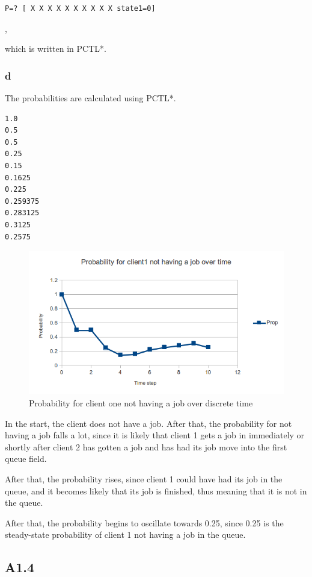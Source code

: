 \begin{verbatim}P=? [ X X X X X X X X X X state1=0]\end{verbatim},

which is written in PCTL*.

\subsubsection{d}

The probabilities are calculated using PCTL*.

\begin{verbatim}
1.0
0.5
0.5
0.25
0.15
0.1625
0.225
0.259375
0.283125
0.3125
0.2575
\end{verbatim}

\begin{figure}[!htb]
\centering
\includegraphics[scale=.75]{images/chart_client1_nojob_time_prop.png}
\caption{Probability for client one not having a job over discrete time}
\label{fig:nojobprop}
\end{figure}

In the start, the client does not have a job.
After that, the probability for not having a job falls a lot,
since it is likely that client 1 gets a job in immediately
or shortly after client 2 has gotten a job and has had its
job move into the first queue field.

After that, the probability rises, since client 1 could
have had its job in the queue, and it becomes likely that
its job is finished, thus meaning that it is not in the queue.

After that, the probability begins to oscillate towards 0.25,
since 0.25 is the steady-state probability of client 1 not having a job in the queue.

\subsection{A1.4}

